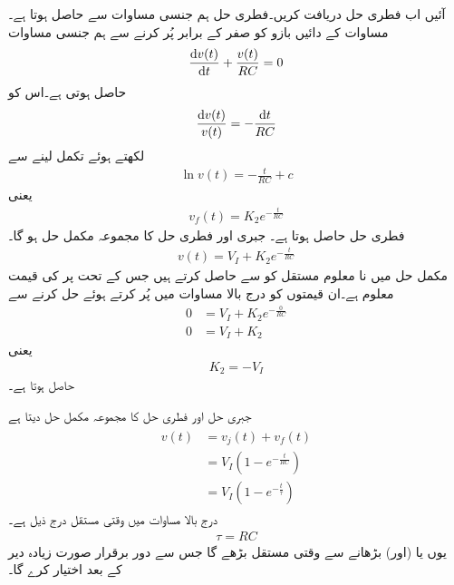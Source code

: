 آئیں اب فطری حل دریافت کریں۔فطری حل ہم جنسی مساوات سے حاصل ہوتا ہے۔مساوات  کے دائیں بازو کو صفر کے برابر پُر کرنے سے ہم جنسی مساوات
\begin{align}\label{مساوات_عارضی_برق_گیر_ہم_جنسی_الف}
\frac{\dif v(t)}{\dif t}+\frac{v(t)}{RC}=0
\end{align}
 حاصل ہوتی ہے۔اس کو
\begin{align*}
\frac{\dif v(t)}{v(t)}=-\frac{\dif t}{RC}
\end{align*}
لکھتے ہوئے تکمل لینے سے
\begin{align*}
\ln v(t)=-\frac{t}{RC}+c
\end{align*}
یعنی
\begin{align*}
v_f(t)=K_2 e^{-\frac{t}{RC}}
\end{align*}
فطری حل حاصل ہوتا ہے۔ جبری اور فطری حل کا مجموعہ مکمل حل ہو گا۔
\begin{align*}
v(t)=V_I+K_2 e^{-\frac{t}{RC}}
\end{align*}
مکمل حل میں نا معلوم مستقل کو  سے حاصل کرتے ہیں جس کے تحت  پر  کی قیمت معلوم ہے۔ان قیمتوں کو درج بالا مساوات میں پُر کرتے ہوئے حل کرنے سے
\begin{align*}
0&=V_I+K_2 e^{-\frac{0}{RC}}\\
0&=V_I+K_2
\end{align*}
یعنی
\begin{align*}
K_2=-V_I
\end{align*}
حاصل ہوتا ہے۔ 

جبری حل اور فطری حل کا مجموعہ مکمل حل دیتا ہے
\begin{gather}
\begin{aligned}
v(t)&=v_j(t)+v_f(t)\\
&=V_I\left(1-e^{-\frac{t}{RC}}\right)\\
&=V_I\left(1-e^{-\frac{t}{\tau}}\right)
\end{aligned}
\end{gather}
درج بالا مساوات میں وقتی مستقل درج ذیل ہے۔
\begin{align}
\tau=RC
\end{align}
یوں  یا (اور)  بڑھانے سے  وقتی مستقل بڑھے گا جس سے دور برقرار صورت زیادہ دیر کے بعد اختیار کرے گا۔ 

